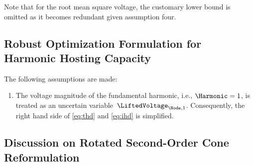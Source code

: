 Note that for the root mean square voltage, the customary lower bound is omitted as it becomes redundant given assumption four. 

\newpage

\subsection{Robust Optimization Formulation for Harmonic Hosting Capacity}

The following assumptions are made:
\begin{enumerate}
    \item The voltage magnitude of the fundamental harmonic, i.e., $\Harmonic = 1$, is treated as an uncertain variable~$\LiftedVoltage_{\Node,1}$. Consequently, the right hand side of \eqref{eq:thd} and \eqref{eq:ihd} is simplified.
\end{enumerate}

\newpage

\subsection{Discussion on Rotated Second-Order Cone Reformulation}

